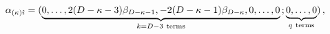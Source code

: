 \begin{equation}
\label{root}
\alpha_{(\kappa)\hat\imath}= (\underbrace {0,\dots,
2(D-\kappa-3)\beta_{D-\kappa-1},-2(D-\kappa-1)\beta_{D-\kappa} ,0,\dots,
0}_{k=D-3 \rm~ terms}\,;\underbrace{0,\dots, 0}_{q\rm ~terms}) \, , 
\end{equation}

